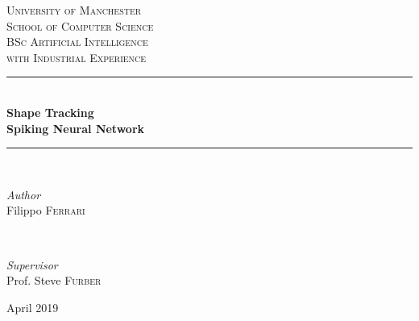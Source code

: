\begin{titlepage}
	\newcommand{\HRule}{\rule{\linewidth}{0.5mm}} %
	
	\center %
	
	
	\textsc{\LARGE University of Manchester}\\[1cm] %
	
	\textsc{\Large School of Computer Science}\\[1cm] %
	
    
	\textsc{\large BSc Artificial Intelligence\\
	with Industrial Experience}\\[1.5cm] %
	
	
	\HRule\\[0.4cm]
	
	{\huge\bfseries Shape Tracking\\
	Spiking Neural Network}\\[0.4cm] %
	
	\HRule\\[2.0cm]
	
	
	\begin{minipage}{0.4\textwidth}
		\begin{flushleft}
			\large
			\textit{Author}\\
			Filippo \textsc{Ferrari} %
		\end{flushleft}
	\end{minipage}
	~
	\begin{minipage}{0.4\textwidth}
		\begin{flushright}
			\large
			\textit{Supervisor}\\
			Prof. Steve \textsc{Furber} %
		\end{flushright}
	\end{minipage}
	
    \vfill
    
	{\large April 2019} %

\end{titlepage}